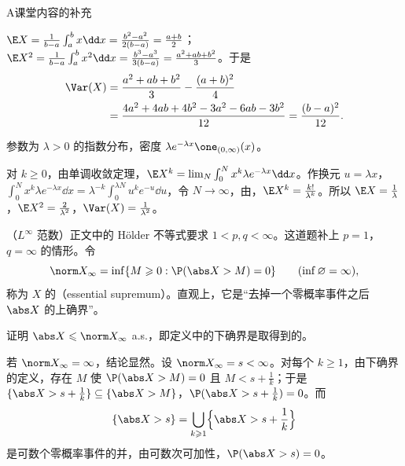 \begin{exercises}{A}{课堂内容的补充}
\begin{questions}
\begin{solution}
$\E X=\frac1{b-a}\int_a^bx\dd x=\frac{b^2-a^2}{2(b-a)}=\frac{a+b}2$；$\E X^2=\frac1{b-a}\int_a^bx^2\dd x=\frac{b^3-a^3}{3(b-a)}=\frac{a^2+ab+b^2}3$。于是
\[
\begin{aligned}
\Var(X)&=\frac{a^2+ab+b^2}3-\frac{(a+b)^2}4\\
&=\frac{4a^2+4ab+4b^2-3a^2-6ab-3b^2}{12}=\frac{(b-a)^2}{12}.
\end{aligned}
\]
\end{solution}
\item 参数为 $\lambda>0$ 的指数分布，密度 $\lambda e^{-\lambda x}\one_{(0,\infty)}(x)$。
\begin{solution}
对 $k\geqslant0$，由单调收敛定理，$\E X^k=\lim_N\int_0^Nx^k\lambda e^{-\lambda x}\dd x$。作换元 $u=\lambda x$，$\int_0^Nx^k\lambda e^{-\lambda x}\dd x=\lambda^{-k}\int_0^{\lambda N}u^ke^{-u}\dd u$，令 $N\to\infty$，由，$\E X^k=\frac{k!}{\lambda^k}$。所以 $\E X=\frac1\lambda$，$\E X^2=\frac2{\lambda^2}$，$\Var(X)=\frac1{\lambda^2}$。
\end{solution}
\end{questions}

\item\label{ex:expectation:A11} （$L^\infty$ 范数）正文中的 Hölder 不等式要求 $1<p,q<\infty$。这道题补上 $p=1$，$q=\infty$ 的情形。令
\[
\norm X_\infty=\inf\{M\geqslant0:\P(\abs X>M)=0\}\qquad(\inf\varnothing=\infty),
\]
称为 $X$ 的（essential supremum）。直观上，它是“去掉一个零概率事件之后 $\abs X$ 的上确界”。
\begin{questions}
\item 证明 $\abs X\leqslant\norm X_\infty$ a.s.，即定义中的下确界是取得到的。
\begin{solution}
若 $\norm X_\infty=\infty$，结论显然。设 $\norm X_\infty=s<\infty$。对每个 $k\geqslant1$，由下确界的定义，存在 $M$ 使 $\P(\abs X>M)=0$ 且 $M<s+\frac1k$；于是 $\{\abs X>s+\frac1k\}\subseteq\{\abs X>M\}$，$\P(\abs X>s+\frac1k)=0$。而
\[
\{\abs X>s\}=\bigcup_{k\geqslant1}\Bigl\{\abs X>s+\frac1k\Bigr\}
\]
是可数个零概率事件的并，由可数次可加性，$\P(\abs X>s)=0$。


\end{solution}
\end{questions}
\end{exercises}
